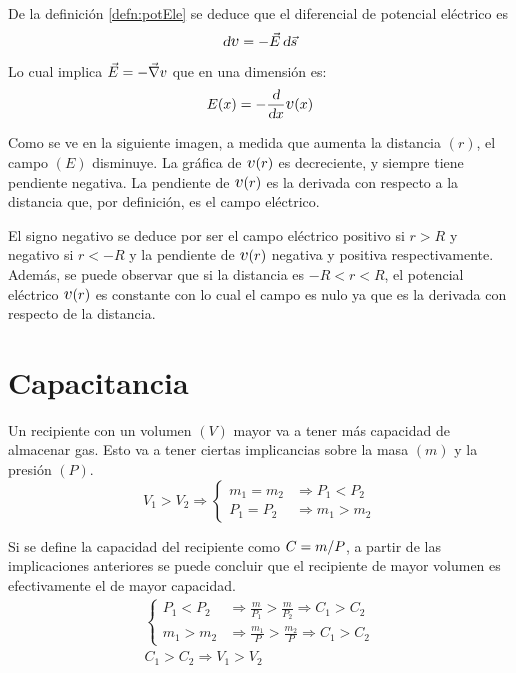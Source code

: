 \documentclass[a5paper,12pt,twoside]{book}
\begin{document}
De la definición \ref{defn:potEle} se deduce que el diferencial de potencial eléctrico es
\begin{equation*}
    \dif \V = - \Vec{E} \, \dif \Vec{s}
\end{equation*}

Lo cual implica $\Vec{E} = - \Vec{\nabla} v$ que en una dimensión es:
\begin{equation*}
    E(x) = - \frac{\dif}{\dif x} \V(x)
\end{equation*}

Como se ve en la siguiente imagen, a medida que aumenta la distancia $(r)$, el campo $(E)$ disminuye.
La gráfica de $\V(r)$ es decreciente, y siempre tiene pendiente negativa.
La pendiente de $\V(r)$ es la derivada con respecto a la distancia que, por definición, es el campo eléctrico.

\begin{center}
    \def\svgwidth{0.8\linewidth}
    
\end{center}

El signo negativo se deduce por ser el campo eléctrico positivo si $r > R$ y negativo si $r < -R$ y la pendiente de $\V(r)$ negativa y positiva respectivamente.
Además, se puede observar que si la distancia es $-R < r < R$, el potencial eléctrico $\V(r)$ es constante con lo cual el campo es nulo ya que es la derivada con respecto de la distancia.


\section{Capacitancia}

Un recipiente con un volumen $(V)$ mayor va a tener más capacidad de almacenar gas. Esto va a tener ciertas implicancias sobre la masa $(m)$ y la presión $(P)$.
\begin{equation*}
    V_1 > V_2 \Rightarrow
    \left\{
    \begin{aligned}
        m_1 = m_2 & \Rightarrow P_1 < P_2
        \\
        P_1 = P_2 & \Rightarrow m_1 > m_2
    \end{aligned}
    \right.
\end{equation*}

Si se define la capacidad del recipiente como $C= m/P$, a partir de las implicaciones anteriores se puede concluir que el recipiente de mayor volumen es efectivamente el de mayor capacidad.
\begin{gather*}
    \left\{
    \begin{aligned}
        P_1 < P_2 & \Rightarrow \frac{m}{P_1} > \frac{m}{P_2} \Rightarrow C_1 > C_2
        \\[1ex]
        m_1 > m_2 & \Rightarrow \frac{m_1}{P} > \frac{m_2}{P} \Rightarrow C_1 > C_2
    \end{aligned}
    \right.
    \\[1em]
    C_1 > C_2 \Rightarrow V_1 > V_2
\end{gather*}
\end{document}
